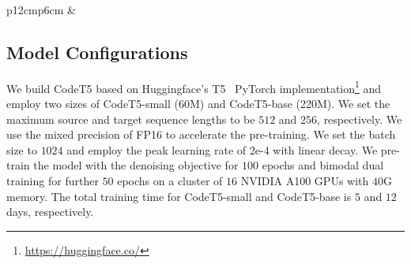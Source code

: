 \documentclass[11pt]{article}
\begin{document}
\begin{table*} [t]
\begin{center}
{\begin{tabular}{p{12cm}p{6cm}}
&
\begin{minipage}{0.36\textwidth}
\captionsetup{type=table}
\vspace{-0.5em}  
\caption{Results on the code defect detection  and clone detection  tasks.}
\label{table:classification}

\end{minipage}
\end{tabular}
}
\end{center}
\vspace{-2em}
\end{table*}

 \subsection{Model Configurations}
We build CodeT5 based on Huggingface's  T5~\cite{DBLP:journals/jmlr/RaffelSRLNMZLL20} PyTorch implementation\footnote{\url{https://huggingface.co/}} and employ two sizes of CodeT5-small (60M) and CodeT5-base (220M).
We set the maximum source and target sequence lengths to be $512$ and $256$, respectively.
We use the mixed precision of FP16 to accelerate the pre-training. We set the batch size to $1024$ and employ the peak learning rate of 2e-4 with  linear decay.
We pre-train the model with the denoising objective for $100$ epochs and  bimodal dual training  for further $50$ epochs on a cluster of $16$ NVIDIA A100 GPUs with $40$G memory. 
The total training time for CodeT5-small and CodeT5-base is $5$ and $12$ days, respectively. 
\end{document}
